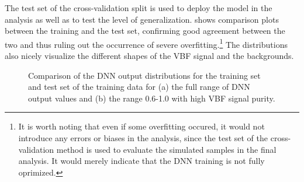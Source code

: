 
The test set of the cross-validation split is used to deploy the model in the analysis as well as to test the level of generalization.
 shows comparison plots between the training and the test set, confirming good agreement between the two and thus ruling out the occurrence of severe overfitting.\footnote{It is worth noting that even if some overfitting occured, it would not introduce any errors or biases in the analysis, since the test set of the cross-validation method is used to evaluate the simulated samples in the final analysis. It would merely indicate that the DNN training is not fully oprimized.}
The distributions also nicely visualize the different shapes of the VBF signal and the backgrounds.
\begin{figure}[t]
    \caption[Comparison of the DNN output distributions for the training set and test set of the training data.]{Comparison of the DNN output distributions for the training set and test set of the training data for (a) the full range of DNN output values and (b) the range 0.6-1.0 with high VBF signal purity.}
    \label{fig:dnn-train-vs-test}
\end{figure}

